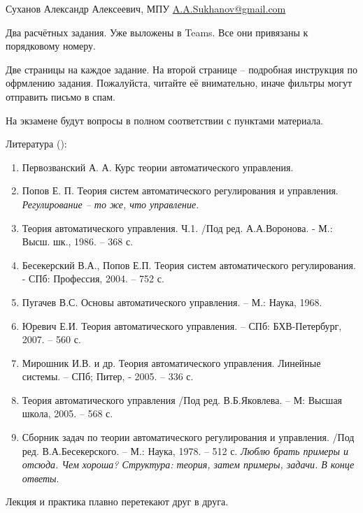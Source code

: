 \documentclass[main.tex]{subfiles}
\begin{document}
Суханов Александр Алексеевич, МПУ \href{mailto:A.A.Sukhanov@gmail.com}{A.A.Sukhanov@gmail.com}

Два расчётных задания.
Уже выложены в Teams.
Все они привязаны к порядковому номеру.

Две страницы на каждое задание.
На второй странице -- подробная инструкция по офрмлению задания.
Пожалуйста, читайте её внимательно, иначе фильтры могут отправить письмо в спам.

На экзамене будут вопросы в полном соответствии с пунктами материала.

Литература ():
\begin{enumerate}[noitemsep]
	\item Первозванский А. А. Курс теории автоматического управления.
	\item Попов Е. П. Теория систем автоматического регулирования и управления. \emph{Регулирование -- то же, что управление}.
	\item Теория автоматического управления. Ч.1. /Под ред. А.А.Воронова. - М.: Высш. шк., 1986. – 368 с.
	\item Бесекерский В.А., Попов Е.П. Теория систем автоматического регулирования. - СПб: Профессия, 2004. – 752 с.
	
	\item Пугачев В.С. Основы автоматического управления. – М.: Наука, 1968.
	
	\item Юревич Е.И. Теория автоматического управления. – СПб: БХВ-Петербург, 2007. – 560 с.
	
	\item Мирошник И.В. и др. Теория автоматического управления. Линейные системы. – СПб; Питер, - 2005. – 336 с.
	\item Теория автоматического управления /Под ред. В.Б.Яковлева. – М: Высшая школа, 2005. – 568 с.
	\item Сборник задач по теории автоматического регулирования и управления. /Под ред. В.А.Бесекерского. – М.: Наука, 1978. – 512 с. \emph{Люблю брать примеры и отсюда. Чем хороша? Структура: теория, затем примеры, задачи. В конце ответы}.
\end{enumerate}

Лекция и практика плавно перетекают друг в друга.
\end{document}

